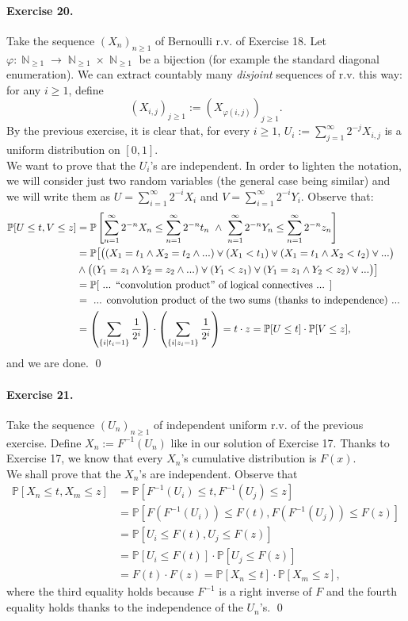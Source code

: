 \documentclass[12pt,a4paper]{report}
\theoremstyle{definition}
\theoremstyle{num.custom-title}
\DeclareMathOperator{\N}{\mathbb{N}}
\newcommand{\veedot}{\mathbin{\mathaccent\cdot\vee}}
\renewcommand{\phi}{\varphi}
\renewcommand{\P}{\mathbb{P}}
\renewcommand{\1}{\mathbbm{1}}
\begin{document}
\paragraph{Exercise 20.} Take the sequence $(X_n)_{n \geq 1}$ of Bernoulli r.v. of Exercise 18. Let $\phi: \N_{\geq 1} \to \N_{\geq 1} \times \N_{\geq 1}$ be a bijection (for example the standard diagonal enumeration). We can extract countably many \emph{disjoint} sequences of r.v. this way: for any $i \geq 1$, define
\[
(X_{i,j})_{j \geq 1} := (X_{\phi(i,j)})_{j \geq 1}.
\]
By the previous exercise, it is clear that, for every $i \geq 1$, $U_i:= \sum_{j=1}^\infty 2^{-j} X_{i,j}$ is a uniform distribution on $[0,1]$.\\
We want to prove that the $U_i$'s are independent. In order to lighten the notation, we will consider just two random variables (the general case being similar) and we will write them as $U=\sum_{i=1}^\infty 2^{-i} X_i$ and $V=\sum_{i=1}^\infty 2^{-i} Y_i$. Observe that:
\begin{align*}
\P[U \leq t, V \leq z]
&= \P \left[ \sum_{n=1}^\infty 2^{-n} X_n \leq \sum_{n=1}^\infty 2^{-n} t_n \ \wedge \ \sum_{n=1}^\infty 2^{-n} Y_n \leq \sum_{n=1}^\infty 2^{-n} z_n \right]\\
&= \P \big[ \big( (X_1=t_1 \wedge X_2=t_2 \wedge ... ) \veedot (X_1 < t_1) \veedot (X_1=t_1 \wedge X_2 < t_2) \veedot ... \big) \\
& \wedge \big( (Y_1=z_1 \wedge Y_2=z_2 \wedge ... ) \veedot (Y_1 < z_1) \veedot (Y_1=z_1 \wedge Y_2 < z_2) \veedot ... \big)  \big]\\
&= \P[ \text{ ... ``convolution product'' of logical connectives ... }]\\
&= \text{ ... convolution product of the two sums (thanks to independence) ... }\\
&= \left( \sum_{\{i \mid t_i=1\}} \frac{1}{2^i} \right) \cdot \left( \sum_{\{i \mid z_i=1\}} \frac{1}{2^i} \right) = t \cdot z = \P[U \leq t] \cdot \P[V \leq z],
\end{align*}
and we are done. \qed

\paragraph{Exercise 21.} Take the sequence $(U_n)_{n \geq 1}$ of independent uniform r.v. of the previous exercise. Define $X_n:=F^{-1}(U_n)$ like in our solution of Exercise 17. Thanks to Exercise 17, we know that every $X_n$'s cumulative distribution is $F(x)$.\\
We shall prove that the $X_n$'s are independent. Observe that
\begin{align*}
\P[X_n \leq t, X_m \leq z]
&= \P[F^{-1}(U_i) \leq t, F^{-1}(U_j) \leq z]\\
&= \P[F(F^{-1}(U_i)) \leq F(t), F(F^{-1}(U_j)) \leq F(z)]\\
&= \P[U_i \leq F(t), U_j \leq F(z)]\\
&= \P[U_i \leq F(t)] \cdot \P[U_j \leq F(z)]\\
&= F(t) \cdot F(z) = \P[X_n \leq t] \cdot \P[X_m \leq z],
\end{align*}
where the third equality holds because $F^{-1}$ is a right inverse of $F$ and the fourth equality holds thanks to the independence of the $U_n$'s. \qed
\end{document}
